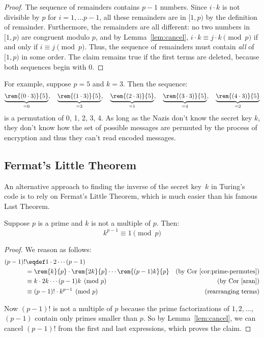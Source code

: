 \begin{proof}
The sequence of remainders contains $p-1$ numbers.  Since $i \cdot k$ is not divisible by
$p$ for $i=1,\dots p-1$, all these remainders are in $[1,p)$ by the definition of
  remainder.  Furthermore, the remainders are all different: no two numbers in $[1,p)$ are
    congruent modulo $p$, and by Lemma~\ref{lem:cancel}, $i \cdot k \equiv j \cdot k
    \pmod{p}$ if and only if $i \equiv j \pmod{p}$.  Thus, the sequence of remainders must
    contain \emph{all} of $[1,p)$ in some order.  The claim remains true if the first
      terms are deleted, because both sequences begin with 0.
\end{proof}

For example, suppose $p = 5$ and $k = 3$.  Then the sequence:
\[
\underbrace{\rem{(0 \cdot 3)}{5}}_{=0},\quad \underbrace{\rem{(1 \cdot 3)}{5}}_{=3},\quad
\underbrace{\rem{(2 \cdot 3)}{5}}_{=1},\quad \underbrace{\rem{(3 \cdot 3)}{5}}_{=4},\quad
\underbrace{\rem{(4 \cdot 3)}{5}}_{=2}
\]
is a permutation of 0, 1, 2, 3, 4.  As long as the Nazis don't know the secret key $k$,
they don't know how the set of possible messages are permuted by the process of encryption
and thus they can't read encoded messages.


\subsection{Fermat's Little Theorem}

An alternative approach to finding the inverse of the secret key~$k$ in Turing's code is to
rely on Fermat's Little Theorem, which is much easier than his famous Last Theorem.
\iffalse ---and more useful.\fi

\begin{theorem}\label{fermat_little}
Suppose $p$ is a prime and $k$ is not a multiple of $p$.  Then:
\[
k^{p-1} \equiv 1 \pmod{p}
\]
\end{theorem}

\begin{proof}
We reason as follows:
\begin{align*}
(p-1)! &\eqdef 1 \cdot 2 \cdots (p-1)\\ & = \rem{k}{p} \cdot \rem{2k}{p} \cdots
  \rem{(p-1)k}{p} & \text{(by Cor~\ref{cor:prime-permutes})}\\ & \equiv k \cdot 2k \cdots
  (p-1) k \pmod{p} & \text{(by Cor~\ref{aran})}\\ & \equiv (p-1)! \cdot k^{p-1} \pmod{p} &
  \text{(rearranging terms)}\\
\end{align*}

Now $(p - 1)!$ is not a multiple of $p$ because the prime factorizations of $1, 2, \dots$,
$(p - 1)$ contain only primes smaller than $p$.  So by Lemma~\ref{lem:cancel}, we can
cancel $(p - 1)!$ from the first and last expressions, which proves the claim.
\end{proof}

